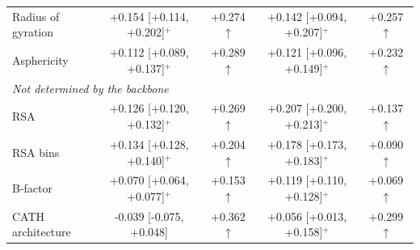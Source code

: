 \begin{table}[t]
{\begin{tabular}{lcccc}
Radius of gyration & +0.154 [+0.114, +0.202]$^{+}$ & +0.274 $\uparrow$ & +0.142 [+0.094, +0.207]$^{+}$ & +0.257 $\uparrow$ \\
Asphericity & +0.112 [+0.089, +0.137]$^{+}$ & +0.289 $\uparrow$ & +0.121 [+0.096, +0.149]$^{+}$ & +0.232 $\uparrow$ \\
\multicolumn{5}{l}{\emph{Not determined by the backbone}} \\
RSA & +0.126 [+0.120, +0.132]$^{+}$ & +0.269 $\uparrow$ & +0.207 [+0.200, +0.213]$^{+}$ & +0.137 $\uparrow$ \\
RSA bins & +0.134 [+0.128, +0.140]$^{+}$ & +0.204 $\uparrow$ & +0.178 [+0.173, +0.183]$^{+}$ & +0.090 $\uparrow$ \\
B-factor & +0.070 [+0.064, +0.077]$^{+}$ & +0.153 $\uparrow$ & +0.119 [+0.110, +0.128]$^{+}$ & +0.069 $\uparrow$ \\
CATH architecture & -0.039 [-0.075, +0.048] & +0.362 $\uparrow$ & +0.056 [+0.013, +0.158]$^{+}$ & +0.299 $\uparrow$ \\
\bottomrule
\end{tabular}}
\end{table}
